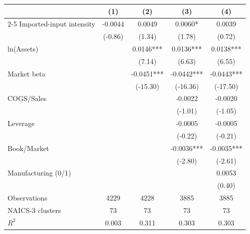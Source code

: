 \begin{tabular}{lcccc}
\toprule
& \multicolumn{1}{c}{(1)} & \multicolumn{1}{c}{(2)} & \multicolumn{1}{c}{(3)} & \multicolumn{1}{c}{(4)} \\
\cmidrule(lr){2-5}
Imported-input intensity & -0.0044 & 0.0049 & 0.0060* & 0.0039 \\
 & (-0.86) & (1.34) & (1.78) & (0.72) \\[3pt]
ln(Assets) &  & 0.0146*** & 0.0136*** & 0.0138*** \\
 &  & (7.14) & (6.63) & (6.55) \\[3pt]
Market beta &  & -0.0451*** & -0.0442*** & -0.0443*** \\
 &  & (-15.30) & (-16.36) & (-17.50) \\[3pt]
COGS/Sales &  &  & -0.0022 & -0.0020 \\
 &  &  & (-1.01) & (-1.05) \\[3pt]
Leverage &  &  & -0.0005 & -0.0005 \\
 &  &  & (-0.22) & (-0.21) \\[3pt]
Book/Market &  &  & -0.0036*** & -0.0035*** \\
 &  &  & (-2.80) & (-2.61) \\[3pt]
Manufacturing (0/1) &  &  &  & 0.0053 \\
 &  &  &  & (0.40) \\[3pt]
\midrule
Observations & 4229 & 4228 & 3885 & 3885 \\
NAICS-3 clusters & 73 & 73 & 73 & 73 \\
$R^2$ & 0.003 & 0.311 & 0.303 & 0.303 \\
\bottomrule
\end{tabular}